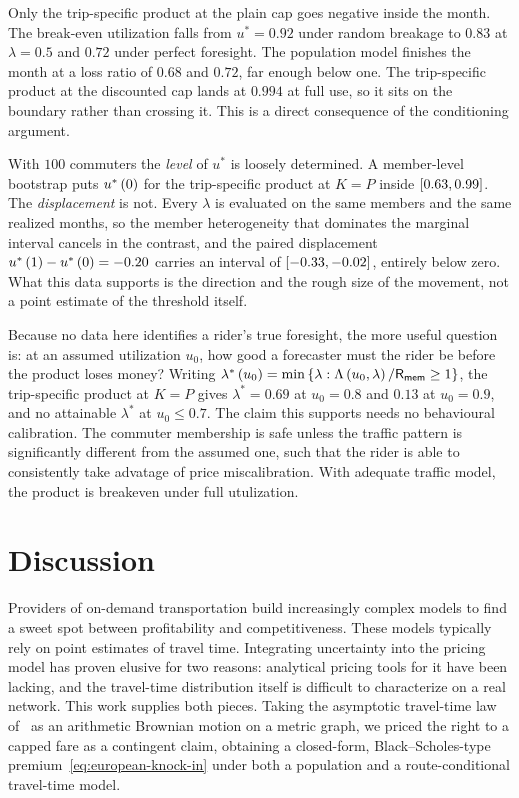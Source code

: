 \documentclass[12pt]{article}
\def\memebership{\textsf{R}_\textsf{mem}}
\begin{document}
{{{{{{{{Only the trip-specific product at the plain cap goes negative inside the month. The break-even utilization falls from $u^{*} = 0.92$ under
random breakage to $0.83$ at $\lambda = 0.5$ and $0.72$ under perfect foresight. The population model finishes the month at a loss ratio of $0.68$ and $0.72$, far enough below one. The trip-specific product at the discounted cap lands at $0.994$
at full use, so it sits on the boundary rather than crossing it. This is a direct consequence of the conditioning argument.

With $100$ commuters the \emph{level} of $u^{*}$ is loosely determined. A member-level
bootstrap puts $u^{*}\left(0\right)$ for the trip-specific product at $K=P$ inside
$\left[0.63, 0.99\right]$. The \emph{displacement} is not. Every $\lambda$ is evaluated on the same
members and the same realized months, so the member heterogeneity that dominates the marginal
interval cancels in the contrast, and the paired displacement
$u^{*}\left(1\right) - u^{*}\left(0\right) = -0.20$ carries an interval of $\left[-0.33, -0.02\right]$, entirely
below zero. What this data supports is the direction and the rough size of the movement, not
a point estimate of the threshold itself.

Because no data here identifies a rider's true foresight, the more useful question is: at an assumed utilization $u_0$, how good a forecaster must the rider be before
the product loses money? Writing
$\lambda^{*}\rbr{u_0} = \min\cbr{\lambda : \Lambda\rbr{u_0,\lambda}/\memebership \ge 1}$, the
trip-specific product at $K = P$ gives $\lambda^{*} = 0.69$ at $u_0 = 0.8$ and $0.13$ at
$u_0 = 0.9$, and no attainable $\lambda^{*}$ at $u_0 \le 0.7$. The claim this supports needs
no behavioural calibration. The commuter membership is safe unless the traffic pattern is significantly different from the assumed one, such that the rider is able to consistently 
take advatage of price miscalibration. With adequate traffic model, the product is breakeven under full utulization. 

\section{Discussion} \label{sec:discussion}
 
Providers of on-demand transportation build increasingly complex models to
find a sweet spot between profitability and competitiveness. These models
typically rely on point estimates of travel time. Integrating uncertainty into the pricing model has proven elusive
for two reasons: analytical pricing tools for it have been lacking, and the
travel-time distribution itself is difficult to characterize on a real network.
This work supplies both pieces. Taking the asymptotic travel-time law of~\cite{elmasri2023asymptotic} as an arithmetic Brownian motion on a metric graph, we
priced the right to a capped fare as a contingent claim, obtaining a
closed-form, Black--Scholes-type premium~\eqref{eq:european-knock-in} under both a
population and a route-conditional travel-time model.
 
}}}}}}}}
\end{document}
